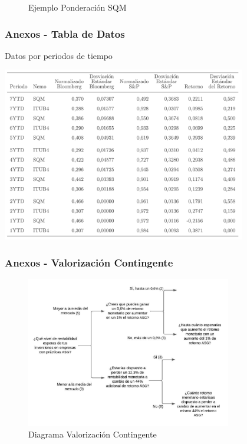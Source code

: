 \documentclass{beamer}
\begin{document}
\begin{frame}
\begin{minipage}{0.45\textwidth}
\begin{figure}
        \caption{Ejemplo Ponderación SQM}
    \end{figure}
    \end{minipage}
\end{frame}



\begin{frame}
    \frametitle{Anexos - Tabla de Datos}
    \begin{table}
        \caption{Datos por periodos de tiempo}
        \includegraphics[width=0.8\textwidth]{Datos.png}
    \end{table}
\end{frame}

\begin{frame}
    \frametitle{Anexos - Valorización Contingente}
    \begin{figure}
        \includegraphics[width=0.8\textwidth]{DiagramaValorizacionContingente.png}
        \caption{Diagrama Valorización Contingente}
    \end{figure}
\end{frame}
\end{document}
